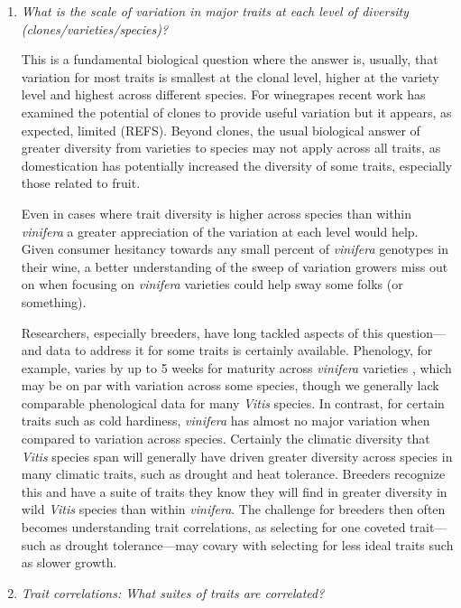 \documentclass[11pt]{article}
\begin{document}
\begin{enumerate}
\item \emph{What is the scale of variation in major traits at each level of diversity (clones/varieties/species)?} 

This is a fundamental biological question where the answer is, usually, that variation for most traits is smallest at the clonal level, higher at the variety level and highest across different species. For winegrapes recent work has examined the potential of clones to provide useful variation but it appears, as expected, limited (REFS). Beyond clones, the usual biological answer of greater diversity from varieties to species may not apply across all traits, as domestication has potentially increased the diversity of some traits, especially those related to fruit. 

Even in cases where trait diversity is higher across species than within \emph{vinifera} a greater appreciation of the variation at each level would help. Given consumer hesitancy  towards any small percent of  \emph{vinifera} genotypes in their wine, a better understanding of the sweep of variation growers miss out on when focusing on  \emph{vinifera} varieties could help sway some folks (or something). 

Researchers, especially breeders, have long tackled aspects of this question---and data to address it for some traits is certainly available. Phenology, for example, varies by up to 5 weeks for maturity across \emph{vinifera} varieties \citep{bours1995}, which may be on par with variation across some species, though we generally lack comparable phenological data for many \emph{Vitis} species. In contrast, for certain traits such as cold hardiness, \emph{vinifera} has almost no major variation when compared to variation across species. Certainly the climatic diversity that \emph{Vitis} species span will generally have driven greater diversity across species in many climatic traits, such as drought and heat tolerance. Breeders recognize this and have a suite of traits they know they will find in greater diversity in wild \emph{Vitis} species than within  \emph{vinifera}. The challenge for breeders then often becomes understanding trait correlations, as selecting for one coveted trait---such as drought tolerance---may covary with selecting for less ideal traits such as slower growth. 

\item \emph{Trait correlations: What suites of traits are correlated?} 


\end{enumerate}
\end{document}
